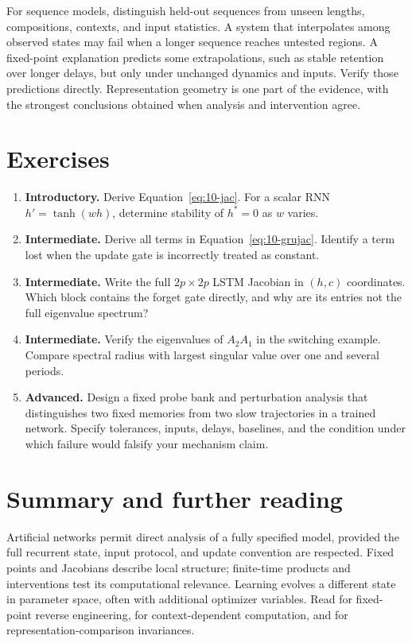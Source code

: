 For sequence models, distinguish held-out sequences from unseen lengths, compositions, contexts, and input statistics. A system that interpolates among observed states may fail when a longer sequence reaches untested regions. A fixed-point explanation predicts some extrapolations, such as stable retention over longer delays, but only under unchanged dynamics and inputs. Verify those predictions directly. Representation geometry is one part of the evidence, with the strongest conclusions obtained when analysis and intervention agree.

\section{Exercises}
\begin{enumerate}
\item \textbf{Introductory.} Derive Equation~\eqref{eq:10-jac}. For a scalar RNN $h'=\tanh(wh)$, determine stability of $h^*=0$ as $w$ varies.
\item \textbf{Intermediate.} Derive all terms in Equation~\eqref{eq:10-grujac}. Identify a term lost when the update gate is incorrectly treated as constant.
\item \textbf{Intermediate.} Write the full $2p\times2p$ LSTM Jacobian in $(h,c)$ coordinates. Which block contains the forget gate directly, and why are its entries not the full eigenvalue spectrum?
\item \textbf{Intermediate.} Verify the eigenvalues of $A_2A_1$ in the switching example. Compare spectral radius with largest singular value over one and several periods.
\item \textbf{Advanced.} Design a fixed probe bank and perturbation analysis that distinguishes two fixed memories from two slow trajectories in a trained network. Specify tolerances, inputs, delays, baselines, and the condition under which failure would falsify your mechanism claim.
\end{enumerate}

\section{Summary and further reading}
Artificial networks permit direct analysis of a fully specified model, provided the full recurrent state, input protocol, and update convention are respected. Fixed points and Jacobians describe local structure; finite-time products and interventions test its computational relevance. Learning evolves a different state in parameter space, often with additional optimizer variables. Read \citet{app_sussillo2013} for fixed-point reverse engineering, \citet{app_mante2013} for context-dependent computation, and \citet{app_kornblith2019} for representation-comparison invariances.
